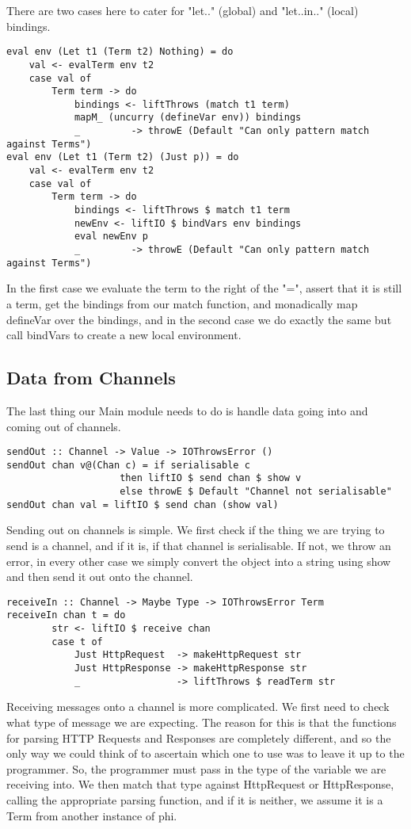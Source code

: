 There are two cases here to cater for "let.." (global) and "let..in.." (local) bindings.
\begin{verbatim}
eval env (Let t1 (Term t2) Nothing) = do 
    val <- evalTerm env t2 
    case val of 
        Term term -> do
            bindings <- liftThrows (match t1 term)
            mapM_ (uncurry (defineVar env)) bindings
            _         -> throwE (Default "Can only pattern match against Terms")
eval env (Let t1 (Term t2) (Just p)) = do
    val <- evalTerm env t2 
    case val of 
        Term term -> do
            bindings <- liftThrows $ match t1 term
            newEnv <- liftIO $ bindVars env bindings
            eval newEnv p
            _         -> throwE (Default "Can only pattern match against Terms")
\end{verbatim}
In the first case we evaluate the term to the right of the "=", assert that it is still a term, get the bindings from our match function, and monadically map defineVar over the bindings, and in the second case we do exactly the same but call bindVars to create a new local environment.

\subsection{Data from Channels}

The last thing our Main module needs to do is handle data going into and coming out of channels.
\label{sec:sendout}
\begin{verbatim}
sendOut :: Channel -> Value -> IOThrowsError () 
sendOut chan v@(Chan c) = if serialisable c
                    then liftIO $ send chan $ show v
                    else throwE $ Default "Channel not serialisable" 
sendOut chan val = liftIO $ send chan (show val)
\end{verbatim}
Sending out on channels is simple. We first check if the thing we are trying to send is a channel, and if it is, if that channel is serialisable. If not, we throw an error, in every other case we simply convert the object into a string using show and then send it out onto the channel.

\label{sec:receiveIn}
\begin{verbatim}
receiveIn :: Channel -> Maybe Type -> IOThrowsError Term
receiveIn chan t = do
        str <- liftIO $ receive chan
        case t of
            Just HttpRequest  -> makeHttpRequest str
            Just HttpResponse -> makeHttpResponse str
            _                 -> liftThrows $ readTerm str
\end{verbatim}
Receiving messages onto a channel is more complicated. We first need to check what type of message we are expecting. The reason for this is that the functions for parsing HTTP Requests and Responses are completely different, and so the only way we could think of to ascertain which one to use was to leave it up to the programmer. So, the programmer must pass in the type of the variable we are receiving into. We then match that type against HttpRequest or HttpResponse, calling the appropriate
parsing function, and if it is neither, we assume it is a Term from another instance of phi.

